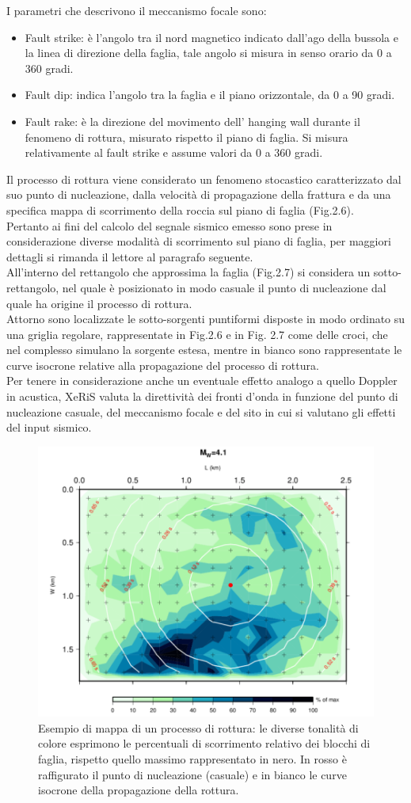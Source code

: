 \documentclass[a4paper,12pt,titlepage]{article}
\begin{document}
I parametri che descrivono il meccanismo focale sono:
\begin{itemize}
\item  Fault strike: è l'angolo tra il nord magnetico indicato dall'ago della bussola e la linea di direzione della faglia, tale angolo si misura in senso
orario da 0 a 360 gradi.
\item  Fault dip: indica l'angolo tra la faglia e il piano orizzontale, da 0 a 90 gradi.
\item Fault rake: è la direzione del movimento dell' hanging wall durante il fenomeno di rottura, misurato rispetto il piano di faglia. Si misura relativamente al fault strike e assume valori da 0 a 360 gradi.
\end{itemize}
%
Il processo di rottura viene considerato un fenomeno stocastico caratterizzato dal suo punto di nucleazione, dalla velocità di propagazione della frattura e da una specifica mappa di scorrimento della roccia sul piano di faglia (Fig.2.6).\\
Pertanto ai fini del calcolo del segnale sismico emesso sono prese in considerazione diverse modalità di scorrimento sul piano di faglia, per maggiori dettagli si rimanda il lettore al paragrafo seguente.\\
All'interno del rettangolo che approssima la faglia (Fig.2.7) si considera un sotto-rettangolo, nel quale è posizionato in modo casuale il punto di nucleazione dal quale ha origine il processo di rottura.\\
Attorno sono localizzate le sotto-sorgenti puntiformi disposte in modo ordinato su una griglia regolare, rappresentate in Fig.2.6 e in Fig. 2.7 come delle croci, che nel complesso simulano la sorgente estesa, mentre in bianco sono rappresentate le curve isocrone relative alla propagazione del processo di rottura.\\
Per tenere in considerazione anche un eventuale effetto analogo a quello Doppler in acustica, XeRiS valuta la direttività dei fronti d'onda in funzione del punto di nucleazione casuale, del meccanismo focale e del sito in cui si valutano gli effetti del input sismico.\\

\begin{figure}[htbp]
 \centering
 \includegraphics[width=.5\linewidth]{Img/SlipMap.png}
 \caption{Esempio di mappa di un processo di rottura: le diverse tonalità di colore esprimono le percentuali di scorrimento relativo dei blocchi di faglia, rispetto quello massimo rappresentato in nero. In rosso è raffigurato il punto di nucleazione (casuale) e in bianco le curve isocrone della propagazione della rottura.}
 \label{fig:SlipMap}
\end{figure}
\end{document}
